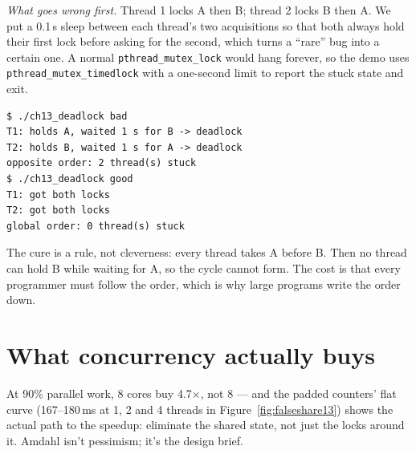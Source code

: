 \begin{example}
\emph{What goes wrong first.} Thread 1 locks A then B; thread 2
locks B then A. We put a 0.1\,s sleep between each thread's two
acquisitions so that both always hold their first lock before asking
for the second, which turns a ``rare'' bug into a certain one. A
normal \texttt{pthread\_mutex\_lock} would hang forever, so the demo
uses \texttt{pthread\_mutex\_timedlock} with a one-second limit to
report the stuck state and exit.

\begin{lstlisting}[basicstyle=\ttfamily\scriptsize,caption={Real output of
\texttt{ch13\_deadlock bad} and \texttt{ch13\_deadlock good}. The two
report lines may print in either order.}]
$ ./ch13_deadlock bad
T1: holds A, waited 1 s for B -> deadlock
T2: holds B, waited 1 s for A -> deadlock
opposite order: 2 thread(s) stuck
$ ./ch13_deadlock good
T1: got both locks
T2: got both locks
global order: 0 thread(s) stuck
\end{lstlisting}
The cure is a rule, not cleverness: every thread takes A before B.
Then no thread can hold B while waiting for A, so the cycle cannot
form. The cost is that every programmer must follow the order, which
is why large programs write the order down.
\end{example}

\section{What concurrency actually buys}
\label{sec:amdahl13}



At 90\% parallel work, 8 cores buy 4.7$\times$, not 8 --- and the
padded counters' flat curve (167--180\,ms at 1, 2 and 4 threads in
Figure~\ref{fig:falseshare13}) shows the actual path to the
speedup: eliminate the shared state, not just the locks around it.
Amdahl isn't pessimism; it's the design brief.

